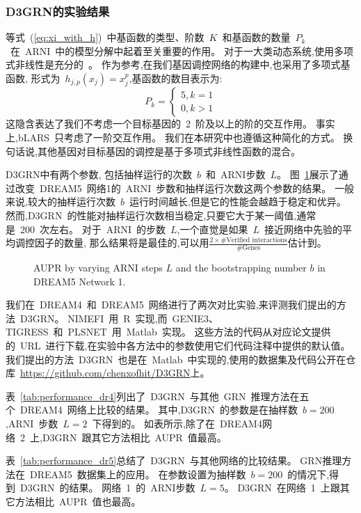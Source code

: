 \subsubsection{D3GRN的实验结果}
等式~(\ref{eq:xi_with_h})~中基函数的类型、阶数~$K$~和基函数的数量~$P_k$~在~ARNI~中的模型分解中起着至关重要的作用。
对于一大类动态系统,使用多项式非线性是充分的~\cite{mangan2016inferring}。
作为参考,在我们基因调控网络的构建中,也采用了多项式基函数,
形式为~$h_{j,p}(x_j)=x_j^p$,基函数的数目表示为: 
\begin{equation}
P_k=\left\{\begin{matrix}
5,  k=1\\ 
0,  k>1
\end{matrix}\right. 
\end{equation}
这隐含表达了我们不考虑一个目标基因的~2~阶及以上的阶的交互作用。
事实上,bLARS~\cite{singh2016blars}只考虑了一阶交互作用。
我们在本研究中也遵循这种简化的方式。
换句话说,其他基因对目标基因的调控是基于多项式非线性函数的混合。

D3GRN中有两个参数,
包括抽样运行的次数~$b$~和~ARNI步数~$L$。
图~\ref{fig:performance_dr5}展示了通过改变~DREAM5~网络1的~ARNI~步数和抽样运行次数这两个参数的结果。
一般来说,较大的抽样运行次数~$b$~运行时间越长,但是它的性能会越趋于稳定和优异。
然而,D3GRN~的性能对抽样运行次数相当稳定,只要它大于某一阈值,通常是~200~次左右。
对于~ARNI~的步数~$L$,一个直觉是如果~$L$~接近网络中先验的平均调控因子的数量,
那么结果将是最佳的,可以用$\frac{2  \times \#\text{Verified interactions}}{\#\text{Genes}}$估计到。
 
\begin{figure}[!htbp]
\centering

\caption{AUPR by varying ARNI steps $L$ and the bootstrapping number $b$ in DREAM5  Network 1.}
\label{fig:performance_dr5}
\end{figure}

我们在~DREAM4~和~DREAM5~网络进行了两次对比实验,来评测我们提出的方法~D3GRN。
NIMEFI~用~R~实现,而~GENIE3、TIGRESS~和~PLSNET~用~Matlab~实现。
这些方法的代码从对应论文提供的~URL~进行下载,在实验中各方法中的参数使用它们代码注释中提供的默认值。
我们提出的方法~D3GRN~也是在~Matlab~中实现的,使用的数据集及代码公开在仓库~\url{https://github.com/chenxofhit/D3GRN}上。

表~\ref{tab:performance_dr4}列出了~D3GRN~与其他~GRN~推理方法在五个~DREAM4~网络上比较的结果。
其中,D3GRN~的参数是在抽样数~$b=200$,ARNI~步数~$L=2$~下得到的。
如表所示,除了在~DREAM4网络~2~上,D3GRN~跟其它方法相比~AUPR~值最高。

表~\ref{tab:performance_dr5}总结了~D3GRN~与其他网络的比较结果。
GRN推理方法在~DREAM5~数据集上的应用。
在参数设置为抽样数~$b=200$~的情况下,得到~D3GRN~的结果。
网络~1~的~ARNI步数~$L=5$。
D3GRN~在网络~1~上跟其它方法相比~AUPR~值也最高。

